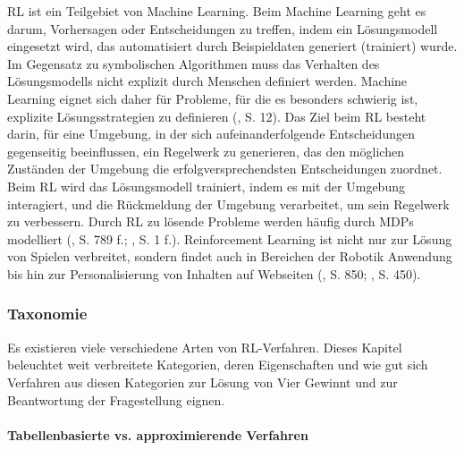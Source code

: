 \label{reinforcement-learning}

RL ist ein Teilgebiet von Machine Learning. Beim Machine Learning geht es darum, Vorhersagen oder Entscheidungen zu treffen, indem ein Lösungsmodell eingesetzt wird, das automatisiert durch Beispieldaten generiert (trainiert) wurde. Im Gegensatz zu symbolischen Algorithmen muss das Verhalten des Lösungsmodells nicht explizit durch Menschen definiert werden. Machine Learning eignet sich daher für Probleme, für die es besonders schwierig ist, explizite Lösungsstrategien zu definieren (\cite{Humm.2020}, S. 12). Das Ziel beim RL besteht darin, für eine Umgebung, in der sich aufeinanderfolgende Entscheidungen gegenseitig beeinflussen, ein Regelwerk zu generieren, das den möglichen Zuständen der Umgebung die erfolgversprechendsten Entscheidungen zuordnet. Beim RL wird das Lösungsmodell trainiert, indem es mit der Umgebung interagiert, und die Rückmeldung der Umgebung verarbeitet, um sein Regelwerk zu verbessern. Durch RL zu lösende Probleme werden häufig durch MDPs modelliert (\cite{Russell.2020}, S. 789 f.; \cite{Sutton.2018}, S. 1 f.). Reinforcement Learning ist nicht nur zur Lösung von Spielen verbreitet, sondern findet auch in Bereichen der Robotik Anwendung bis hin zur Personalisierung von Inhalten auf Webseiten (\cite{Russell.2020}, S. 850; \cite{Sutton.2018}, S. 450).

\subsubsection{Taxonomie}

Es existieren viele verschiedene Arten von RL-Verfahren. Dieses Kapitel beleuchtet weit verbreitete Kategorien, deren Eigenschaften und wie gut sich Verfahren aus diesen Kategorien zur Lösung von Vier Gewinnt und zur Beantwortung der Fragestellung eignen.

\paragraph{Tabellenbasierte vs. approximierende Verfahren}

\label{tabellenbasiert-vs-approximierende-verfahren}

